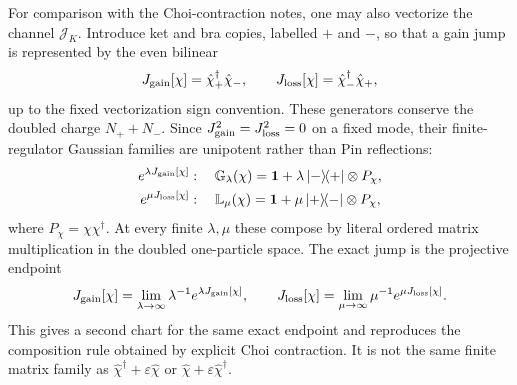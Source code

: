 \documentclass[aps,prb,onecolumn,nofootinbib,superscriptaddress]{revtex4-2}
\newcommand{\I}{\mathbf{1}}
\newcommand{\ket}[1]{\lvert #1\rangle}
\newcommand{\bra}[1]{\langle #1\rvert}
\theoremstyle{plain}
\theoremstyle{definition}
\begin{document}
For comparison with the Choi-contraction notes, one may also vectorize the channel
\(\mathcal J_K\).  Introduce ket and bra copies, labelled \(+\) and \(-\), so
that a gain jump is represented by the even bilinear
\begin{equation}
  J_{\rm gain}[\chi]
  =
  \hat\chi_+^\dagger\hat\chi_- ,
  \qquad
  J_{\rm loss}[\chi]
  =
  \hat\chi_-^\dagger\hat\chi_+ ,
  \label{eq:doubled-gain-loss-generators}
\end{equation}
up to the fixed vectorization sign convention.  These generators conserve the
doubled charge \(N_++N_-\).  Since \(J_{\rm gain}^2=J_{\rm loss}^2=0\) on a
fixed mode, their finite-regulator Gaussian families are unipotent rather than
Pin reflections:
\begin{align}
  e^{\lambda J_{\rm gain}[\chi]}
  &:\quad
  \mathbb G_\lambda(\chi)
  =
  \I+\lambda\,\ket{-}\!\bra{+}\otimes P_\chi ,
  \label{eq:doubled-gain-unipotent}\\
  e^{\mu J_{\rm loss}[\chi]}
  &:\quad
  \mathbb L_\mu(\chi)
  =
  \I+\mu\,\ket{+}\!\bra{-}\otimes P_\chi ,
  \label{eq:doubled-loss-unipotent}
\end{align}
where \(P_\chi=\chi\chi^\dagger\).  At every finite \(\lambda,\mu\) these
compose by literal ordered matrix multiplication in the doubled one-particle
space.  The exact jump is the projective endpoint
\begin{equation}
  J_{\rm gain}[\chi]
  =
  \lim_{\lambda\to\infty}\lambda^{-1}e^{\lambda J_{\rm gain}[\chi]},
  \qquad
  J_{\rm loss}[\chi]
  =
  \lim_{\mu\to\infty}\mu^{-1}e^{\mu J_{\rm loss}[\chi]} .
  \label{eq:doubled-projective-jump-limit}
\end{equation}
This gives a second chart for the same exact endpoint and reproduces the
composition rule obtained by explicit Choi contraction.  It is not the same
finite matrix family as
\(\hat\chi^\dagger+\varepsilon\hat\chi\) or
\(\hat\chi+\varepsilon\hat\chi^\dagger\).
\end{document}
